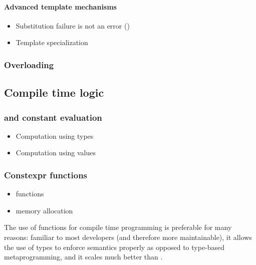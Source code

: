 \documentclass[../main]{subfiles}
\begin{document}
\paragraph{Advanced \cpp template mechanisms}

\begin{itemize}
\item Substitution failure is not an error (\sfinae)
\item Template specialization
\end{itemize}

\subsubsection{Overloading}

\subsection{Compile time logic}

\subsubsection{\Tmp and constant evaluation}

\begin{itemize}
\item Computation using types
\item Computation using values
\end{itemize}

\subsubsection{Constexpr functions}

\begin{itemize}
\item \constexpr functions
\item \constexpr memory allocation
\end{itemize}

The use of \constexpr functions for compile time programming is preferable
for many reasons: familiar to most \cpp developers (and therefore more
maintainable), it allows the use of types to enforce semantics properly
as opposed to type-based metaprogramming, and it scales much better than \tmp.
\end{document}
